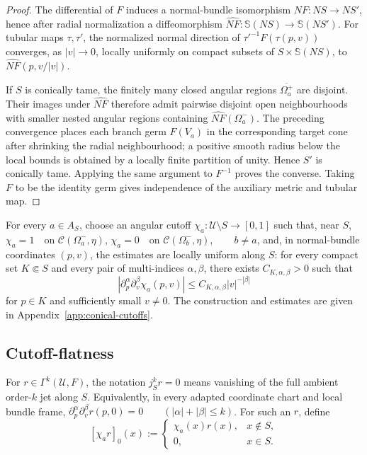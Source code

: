 \documentclass[11pt]{article}
\theoremstyle{plain}
\theoremstyle{definition}
\begin{document}
\begin{proof}
The differential of \(F\) induces a normal-bundle isomorphism \(NF:NS\to NS'\), hence after radial normalization a diffeomorphism \(\widehat{NF}:\mathbb S(NS)\to\mathbb S(NS')\). For tubular maps \(\tau,\tau'\), the normalized normal direction of \(\tau'^{-1}F(\tau(p,v))\) converges, as \(|v|\to0\), locally uniformly on compact subsets of \(S\times\mathbb S(NS)\), to \(\widehat{NF}(p,v/|v|)\).

If \(S\) is conically tame, the finitely many closed angular regions \(\overline{\Omega_a^+}\) are disjoint. Their images under \(\widehat{NF}\) therefore admit pairwise disjoint open neighbourhoods with smaller nested angular regions containing \(\widehat{NF}(\Omega_a^-)\). The preceding convergence places each branch germ \(F(V_a)\) in the corresponding target cone after shrinking the radial neighbourhood; a positive smooth radius below the local bounds is obtained by a locally finite partition of unity. Hence \(S'\) is conically tame. Applying the same argument to \(F^{-1}\) proves the converse. Taking \(F\) to be the identity germ gives independence of the auxiliary metric and tubular map.
\end{proof}

For every \(a\in A_S\), choose an angular cutoff \(\chi_a: \mathcal U\setminus S \longrightarrow[0,1]\) such that, near \(S\),
\(\chi_a=1 \quad \text{on }\mathcal C(\Omega_a^-,\eta)\),
\(\chi_a=0 \quad \text{on }\mathcal C(\Omega_b^-,\eta), \qquad b\neq a\),
and, in normal-bundle coordinates \((p,v)\), the estimates
are locally uniform along \(S\): for every compact set \(K\Subset S\) and every pair of multi-indices \(\alpha,\beta\), there exists \(C_{K,\alpha,\beta}>0\) such that
\[
  \left|
    \partial_p^\alpha
    \partial_v^\beta
    \chi_a(p,v)
  \right|
  \leq
  C_{K,\alpha,\beta}
  |v|^{-|\beta|}
\]
for \(p\in K\) and sufficiently small \(v\neq0\).
The construction and estimates are given in
Appendix~\ref{app:conical-cutoffs}.

\subsection{Cutoff-flatness}
\label{subsec:cutoff-flatness}



For
\(r\in\Gamma^k(\mathcal U,F)\),
the notation \(j_S^k r=0\) means vanishing of the full ambient order-\(k\) jet along \(S\).
Equivalently, in every adapted coordinate chart and local bundle
frame,
\(\partial_p^\alpha\partial_v^\beta r(p,0)=0 \qquad (|\alpha|+|\beta|\leq k)\).
For such an \(r\), define
\[
  [\chi_a r]_0(x)
  :=
  \begin{cases}
    \chi_a(x)r(x),
    &x\notin S,\\
    0,
    &x\in S.
  \end{cases}
\]
\end{document}
